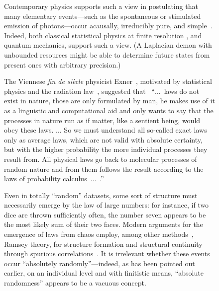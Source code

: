 \documentclass[entropy,article,accept,oneauthor,pdftex]{Definitions/mdpi}
\begin{document}
\begin{figure}[H]
Contemporary physics supports such a view in postulating that many elementary events---such as the spontaneous or stimulated emission of photons---occur acausally, irreducibly pure, and simple~\cite{born-26-1,zeil-05_nature_ofQuantum}.
Indeed, both classical statistical physics at finite resolution
, and quantum mechanics, support such a view.
(A Laplacian demon with unbounded resources might be able to determine
future states from present ones with arbitrary precision.)

The Viennese {\it fin de si\`ecle} physicist Exner~\cite{Hiebert2000,Stoeltzner-1999}, motivated by statistical physics
and the radiation law~\cite{schweidler-1905},
suggested that~\cite[p.~7,18]{Exner-1908}
``$\ldots$~laws do not exist in nature,
those are only formulated by man, he makes use of it
as a linguistic and computational aid
and only wants to say
that the processes in nature run as if matter, like a sentient being, would obey these laws.
$\ldots$
So we must understand all so-called exact laws
only as average laws, which are not valid with absolute certainty,
but with the higher probability
the more individual processes they result from.
All physical laws
go back to molecular processes of random nature
and from them follows the result according to the laws
of probability calculus~$\ldots$~.''

Even in totally ``random'' datasets, some sort of structure must necessarily emerge
by the law of large numbers:
for instance, if two dice are thrown sufficiently often, the number seven appears to be the most likely sum of their two faces.
Modern arguments for the emergence of laws from chaos employ,
among other methods~\cite{armstrong_1983,vanFraassen1989-VANLAS,calude-meyerstein,lawlses_rosen2010,calude2013theeinai,chaos_multiverse2017,Mueller-2017,Cabello-2018-BornRule},
Ramsey theory, for structure formation and structural continuity through spurious correlations~\cite{svozil-2018-was}.
It is irrelevant whether these events occur ``absolutely randomly''---indeed,
as has been pointed out earlier, on an individual level and with finitistic means, ``absolute randomness''
appears to be a vacuous concept.


\end{figure}
\end{document}
